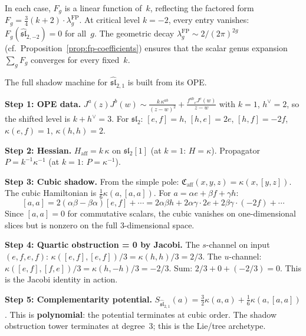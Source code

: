 \begin{computation}[Explicit values through \texorpdfstring{$g = 10$}{g = 10}]
\medskip
\noindent
In each case, $F_g$ is a linear function of~$k$, reflecting the
factored form
$F_g = \frac{3}{4}(k+2) \cdot \lambda_g^{\mathrm{FP}}$.
At critical level $k = -2$, every entry vanishes:
$F_g(\widehat{\mathfrak{sl}}_{2,-2}) = 0$ for all~$g$.
The geometric decay
$\lambda_g^{\mathrm{FP}} \sim 2/(2\pi)^{2g}$
(cf.\ Proposition~\ref{prop:fp-coefficients}) ensures that
the scalar genus expansion $\sum_g F_g$ converges for every fixed~$k$.
\end{computation}

\begin{computation}[The $\widehat{\mathfrak{sl}}_2$ shadow obstruction tower at
$k = 1$: from OPE to Weyl detection]

\label{comp:sl2-shadow-tower}
The full shadow machine for $\widehat{\mathfrak{sl}}_{2,1}$ is built
from its OPE.

\medskip\noindent\textbf{Step 1: OPE data.}
$J^a(z)J^b(w) \sim \frac{k\,\kappa^{ab}}{(z-w)^2}
+ \frac{f^{ab}{}_c J^c(w)}{z-w}$
with $k = 1$, $h^\vee = 2$, so the shifted level is $k+h^\vee = 3$. For $\mathfrak{sl}_2$:
$[e,f] = h$, $[h,e] = 2e$, $[h,f] = -2f$,
$\kappa(e,f) = 1$, $\kappa(h,h) = 2$.

\medskip\noindent\textbf{Step 2: Hessian.}
$H_{\mathrm{aff}} = k\,\kappa$ on $\mathfrak{sl}_2[1]$ (at $k=1$: $H = \kappa$).
Propagator $P = k^{-1}\kappa^{-1}$ (at $k=1$: $P = \kappa^{-1}$).

\medskip\noindent\textbf{Step 3: Cubic shadow.}
From the simple pole:
$\mathfrak{C}_{\mathrm{aff}}(x,y,z) = \kappa(x,[y,z])$.
The cubic Hamiltonian is
$\frac{1}{6}\kappa(a,[a,a])$. For $a = \alpha e + \beta f + \gamma h$:
\[
[a,a] = 2(\alpha\beta - \beta\alpha)[e,f] + \cdots
= 2\alpha\beta h + 2\alpha\gamma \cdot 2e + 2\beta\gamma\cdot(-2f)
+ \cdots
\]
Since $[a,a] = 0$ for commutative scalars, the cubic vanishes on
one-dimensional slices but is nonzero on the full $3$-dimensional
space.

\medskip\noindent\textbf{Step 4: Quartic obstruction = 0 by Jacobi.}
The $s$-channel on input $(e,f,e,f)$:
$\kappa([e,f],[e,f])/3 = \kappa(h,h)/3 = 2/3$.
The $u$-channel:
$\kappa([e,f],[f,e])/3 = \kappa(h,-h)/3 = -2/3$.
Sum: $2/3 + 0 + (-2/3) = 0$.
This is the Jacobi identity in action.

\medskip\noindent\textbf{Step 5: Complementarity potential.}
$S_{\widehat{\mathfrak{sl}}_{2,1}}(a) = \frac{3}{2}\kappa(a,a)
+ \frac{1}{6}\kappa(a,[a,a])$.
This is \textbf{polynomial}: the potential terminates at cubic order.
The shadow obstruction tower terminates at degree~$3$; this is the Lie/tree archetype.


\end{computation}
